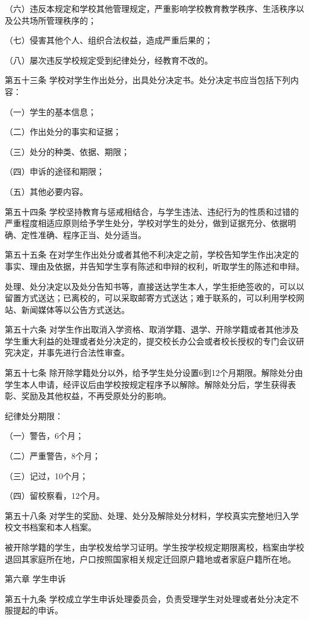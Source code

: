\documentclass[UTF8,12pt,a4paper]{report}
\begin{document}
（六）违反本规定和学校其他管理规定，严重影响学校教育教学秩序、生活秩序以及公共场所管理秩序的；

（七）侵害其他个人、组织合法权益，造成严重后果的；

（八）屡次违反学校规定受到纪律处分，经教育不改的。

第五十三条 学校对学生作出处分，出具处分决定书。处分决定书应当包括下列内容：

（一）学生的基本信息；

（二）作出处分的事实和证据；

（三）处分的种类、依据、期限；

（四）申诉的途径和期限；

（五）其他必要内容。

第五十四条 学校坚持教育与惩戒相结合，与学生违法、违纪行为的性质和过错的严重程度相适应原则给予学生处分，学校对学生的处分，做到证据充分、依据明确、定性准确、程序正当、处分适当。

第五十五条 在对学生作出处分或者其他不利决定之前，学校告知学生作出决定的事实、理由及依据，并告知学生享有陈述和申辩的权利，听取学生的陈述和申辩。

处理、处分决定以及处分告知书等，直接送达学生本人，学生拒绝签收的，可以以留置方式送达；已离校的，可以采取邮寄方式送达；难于联系的，可以利用学校网站、新闻媒体等以公告方式送达。

第五十六条 对学生作出取消入学资格、取消学籍、退学、开除学籍或者其他涉及学生重大利益的处理或者处分决定的，提交校长办公会或者校长授权的专门会议研究决定，并事先进行合法性审查。

第五十七条 除开除学籍处分以外，给予学生处分设置6到12个月期限。解除处分由学生本人申请，经评议后由学校按规定程序予以解除。解除处分后，学生获得表彰、奖励及其他权益，不再受原处分的影响。

纪律处分期限：

（一）警告，6个月；

（二）严重警告，8个月；

（三）记过，10个月；

（四）留校察看，12个月。

第五十八条 对学生的奖励、处理、处分及解除处分材料，学校真实完整地归入学校文书档案和本人档案。

被开除学籍的学生，由学校发给学习证明。学生按学校规定期限离校，档案由学校退回其家庭所在地，户口按照国家相关规定迁回原户籍地或者家庭户籍所在地。



第六章 学生申诉

第五十九条 学校成立学生申诉处理委员会，负责受理学生对处理或者处分决定不服提起的申诉。
\end{document}
